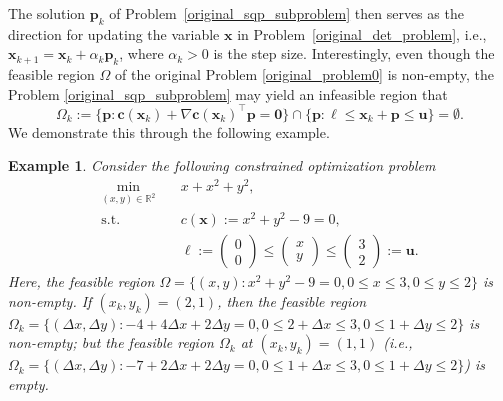 \documentclass[aos]{imsart}
\numberwithin{equation}{section}
\theoremstyle{plain}
\newtheorem{example}{Example}
\begin{document}
The solution $\bm{p}_k$ of Problem~\eqref{original_sqp_subproblem} then serves as the direction for updating the variable $\bm{x}$ in Problem~\eqref{original_det_problem}, i.e., $\bm{x}_{k+1} = \bm{x}_{k} + \alpha_k \bm{p}_k$, where $\alpha_k >0$ is the step size.
Interestingly, even though the feasible region $\Omega$ of the original Problem \eqref{original_problem0} is non-empty, the Problem \eqref{original_sqp_subproblem} may yield an infeasible region that
\begin{equation*}
    \Omega_k := \{\bm{p}: \bm{c}(\bm{x}_k)+\nabla \bm{c}(\bm{x}_k)^{\top}\bm{p} = \bm{0}\} \cap \{\bm{p}: \bm{\ell} \leq \bm{x}_k + \bm{p} \leq \bm{u}\} = \emptyset.
\end{equation*}
We demonstrate this through the following example.

\begin{example}
\label{exmp1}
Consider the following constrained optimization problem
\begin{equation}
    \begin{split}
        \min_{(x,y) \in \mathbb{R}^{2}} & \hspace{1em} x + x^2 + y^2,\\
        \text{s.t.} & \hspace{1em} c(\bm{x}) := x^2 + y^2 -9 =  0,\\
        & \hspace{1em} \bm{\ell} := \left(\begin{array}{c}
             0  \\
             0
        \end{array} \right) \leq \left(\begin{array}{c}
             x  \\
             y 
        \end{array} \right) \leq \left(\begin{array}{c}
             3  \\
             2
        \end{array} \right) := \bm{u}.
    \end{split}
\end{equation}
Here, the feasible region $\Omega = \{(x,y): x^2 + y^2 -9 =0, 0 \leq x \leq 3, 0 \leq y \leq 2\}$ is non-empty. If $(x_k,y_k) = (2,1)$, then the feasible region $\Omega_k = \{(\Delta x,\Delta y): -4 + 4\Delta x + 2\Delta y =0, 0 \leq 2+\Delta x \leq 3, 0 \leq 1+\Delta y \leq 2\}$ is non-empty; but the feasible region $\Omega_k$ at $(x_k,y_k) = (1,1)$ (i.e., $\Omega_k = \{(\Delta x,\Delta y): -7 + 2 \Delta x + 2 \Delta y = 0, 0 \leq 1 + \Delta x \leq 3, 0 \leq 1 + \Delta y \leq 2 \}$) is empty. 
\end{example}
\end{document}
